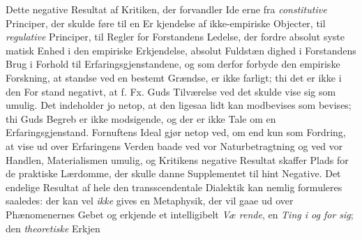 \documentclass[12pt,a4paper]{book}
\begin{document}
Dette negative Resultat af Kritiken, der forvandler Ide\-%
erne fra \emph{constitutive} Principer, der skulde føre til en Er\-%
kjendelse af ikke-empiriske Objecter, til \emph{regulative} Principer,
til Regler for Forstandens Ledelse, der fordre absolut syste\-%
matisk Enhed i den empiriske Erkjendelse, absolut Fuldstæn\-%
dighed i Forstandens Brug i Forhold til Erfaringsgjenstandene,
og som derfor forbyde den empiriske Forskning, at standse ved
en bestemt Grændse, er ikke farligt; thi det er ikke i den For\-%
stand negativt, at f. Fx. Guds Tilværelse ved det skulde vise sig
som umulig. Det indeholder jo netop, at den ligesaa lidt kan
modbevises som bevises; thi Guds Begreb er ikke modsigende,
og der er ikke Tale om en Erfaringsgjenstand. Fornuftens
Ideal gjør netop ved, om end kun som Fordring, at vise ud
over Erfaringens Verden baade ved vor Naturbetragtning og
ved vor Handlen, Materialismen umulig, og Kritikens negative
Resultat skaffer Plads for de praktiske Lærdomme, der skulle
danne Supplementet til hint Negative. Det endelige Resultat
af hele den transscendentale Dialektik kan nemlig formuleres
saaledes: der kan vel \emph{ikke} gives en Metaphysik, der vil gaae
ud over Phænomenernes Gebet og erkjende et intelligibelt \emph{Væ\-%
rende}, en \emph{Ting i og for sig}; den \emph{theoretiske} Erkjen\-%
\end{document}
